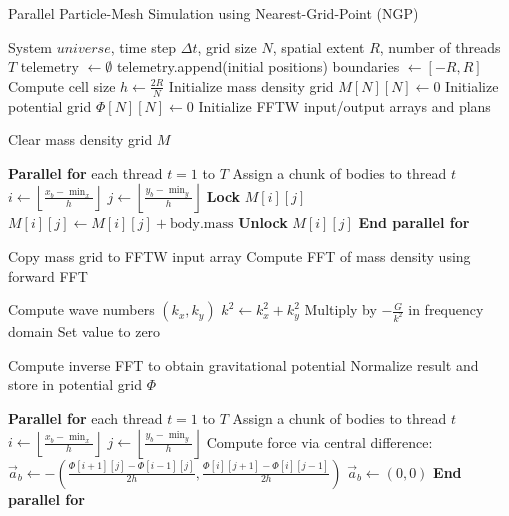 \documentclass{article}
\begin{document}
\begin{algorithm}[H]
\caption{Parallel Particle-Mesh Simulation using Nearest-Grid-Point (NGP)}
\begin{algorithmic}[1]
\Require System $universe$, time step $\Delta t$, grid size $N$, spatial extent $R$, number of threads $T$
\State telemetry $\gets \emptyset$
\State telemetry.append(initial positions)
\State boundaries $\gets [-R, R]$
\State Compute cell size $h \gets \frac{2R}{N}$
\State Initialize mass density grid $M[N][N] \gets 0$
\State Initialize potential grid $\Phi[N][N] \gets 0$
\State Initialize FFTW input/output arrays and plans

    \State Clear mass density grid $M$

    \State \textbf{Parallel for} each thread $t = 1$ to $T$
        \State \quad Assign a chunk of bodies to thread $t$
            \State $i \gets \left\lfloor \frac{x_b - \min_x}{h} \right\rfloor$
            \State $j \gets \left\lfloor \frac{y_b - \min_y}{h} \right\rfloor$        
                \State \textbf{Lock} $M[i][j]$
                \State $M[i][j] \gets M[i][j] + \text{body.mass}$
                \State \textbf{Unlock} $M[i][j]$
            \EndIf
        \EndFor
    \State \textbf{End parallel for}

    \State Copy mass grid to FFTW input array
    \State Compute FFT of mass density using forward FFT

        \State Compute wave numbers $(k_x, k_y)$
        \State $k^2 \gets k_x^2 + k_y^2$
            \State Multiply by $-\frac{G}{k^2}$ in frequency domain
        \Else
            \State Set value to zero
        \EndIf
    \EndFor

    \State Compute inverse FFT to obtain gravitational potential
    \State Normalize result and store in potential grid $\Phi$

    \State \textbf{Parallel for} each thread $t = 1$ to $T$
        \State \quad Assign a chunk of bodies to thread $t$
            \State $i \gets \left\lfloor \frac{x_b - \min_x}{h} \right\rfloor$
            \State $j \gets \left\lfloor \frac{y_b - \min_y}{h} \right\rfloor$
                \State Compute force via central difference:
                \State $\vec{a}_b \gets -\left( \frac{\Phi[i+1][j] - \Phi[i-1][j]}{2h}, \frac{\Phi[i][j+1] - \Phi[i][j-1]}{2h} \right)$
            \Else
                \State $\vec{a}_b \gets (0, 0)$
            \EndIf
        \EndFor
    \State \textbf{End parallel for}


\end{algorithmic}
\end{algorithm}
\end{document}
